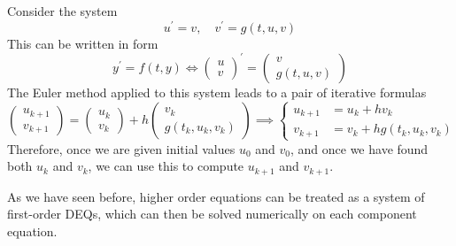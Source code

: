 \documentclass{article}
\newcounter{example}[section]
\begin{document}
    \begin{example}
      \label{ex:eulers-method-for-a-second-order-system}
    Consider the system 
    \begin{equation}
      u^\prime = v, \quad v^\prime = g(t, u, v)
    \end{equation}
    This can be written in form 
    \begin{equation}
      y^\prime = f(t, y) \iff \begin{pmatrix} u \\ v \end{pmatrix}^\prime = \begin{pmatrix} v \\ g(t, u, v) \end{pmatrix}
    \end{equation}
    The Euler method applied to this system leads to a pair of iterative formulas 
    \begin{equation}
      \begin{pmatrix} u_{k+1} \\ v_{k+1} \end{pmatrix} = \begin{pmatrix} u_k \\ v_k \end{pmatrix} + h \begin{pmatrix} v_k \\ g(t_k, u_k, v_k) \end{pmatrix} \implies \begin{cases} u_{k+1} & = u_k + h v_k \\
          v_{k+1} & = v_k + h g(t_k, u_k, v_k) \end{cases}
    \end{equation}
    Therefore, once we are given initial values $u_0$ and $v_0$, and once we have found both $u_k$ and $v_k$, we can use this to compute $u_{k+1}$ and $v_{k+1}$. 
    \end{example}

    As we have seen before, higher order equations can be treated as a system of first-order DEQs, which can then be solved numerically on each component equation. 
\end{document}
